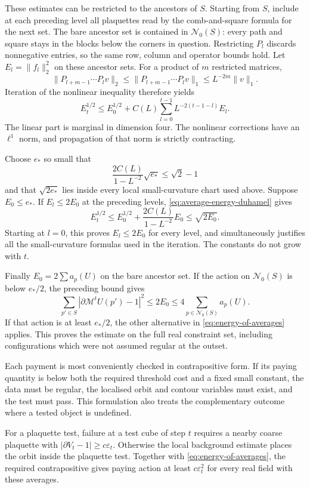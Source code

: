 \documentclass[11pt,letterpaper,reqno]{amsart}
\theoremstyle{definition}
\theoremstyle{remark}
\begin{document}
These estimates can be restricted to the ancestors of \(S\).
Starting from \(S\), include at each preceding level all plaquettes
read by the comb-and-square formula for the next set. The bare
ancestor set is contained in \(\mathcal N_0(S)\): every path and
square stays in the blocks below the corners in question.
Restricting \(P_l\) discards nonnegative entries, so the same row,
column and operator bounds hold. Let \(E_l=\|f_l\|_2^2\) on these
ancestor sets. For a product of \(m\) restricted matrices,
\[
 \|P_{l+m-1}\cdots P_l v\|_2
 \le \|P_{l+m-1}\cdots P_l v\|_1
 \le L^{-2m}\|v\|_1.
\]
Iteration of the nonlinear inequality therefore yields
\begin{equation}\label{eq:average-energy-duhamel}
 E_t^{1/2}\le E_0^{1/2}
       +C(L)\sum_{l=0}^{t-1}L^{-2(t-1-l)}E_l.
\end{equation}
The linear part is marginal in dimension four. The nonlinear
corrections have an \(\ell^1\) norm, and propagation of that norm
is strictly contracting.

Choose \(e_*\) so small that
\[
 \frac{2C(L)}{1-L^{-2}}\sqrt{e_*}\le\sqrt2-1
\]
and that \(\sqrt{2e_*}\) lies inside every local small-curvature
chart used above. Suppose \(E_0\le e_*\).
If \(E_l\le2E_0\) at the preceding levels,
\eqref{eq:average-energy-duhamel} gives
\[
 E_t^{1/2}\le E_0^{1/2}
                  +\frac{2C(L)}{1-L^{-2}}E_0
             \le \sqrt{2E_0}.
\]
Starting at \(l=0\), this proves \(E_l\le2E_0\) for every
level, and simultaneously justifies all the small-curvature
formulas used in the iteration. The constants do not grow with \(t\).

Finally \(E_0=2\sum a_p(U)\) on the bare ancestor set. If the
action on \(\mathcal N_0(S)\) is below \(e_*/2\), the preceding
bound gives
\[
 \sum_{p'\in S}|\partial\mathcal M^tU(p')-1|^2
   \le 2E_0
   \le4\sum_{p\in\mathcal N_0(S)}a_p(U).
\]
If that action is at least \(e_*/2\), the other alternative in
\eqref{eq:energy-of-averages} applies. This proves the estimate
on the full real constraint set, including configurations which
were not assumed regular at the outset.

Each payment is most conveniently checked in contrapositive form.
If its paying quantity is below both the required threshold cost
and a fixed small constant, the data must be regular, the
localised orbit and contour variables must exist, and the test
must pass. This formulation also treats the complementary outcome
where a tested object is undefined.

For a plaquette test, failure at a test cube of step $t$ requires
a nearby coarse plaquette with
$|\partial V_t-1|\ge c\varepsilon_t$. Otherwise the local
background estimate places the orbit inside the plaquette test.
Together with \eqref{eq:energy-of-averages}, the required
contrapositive gives paying action at least
$c\varepsilon_t^2$ for every real field with these averages.
\end{document}
